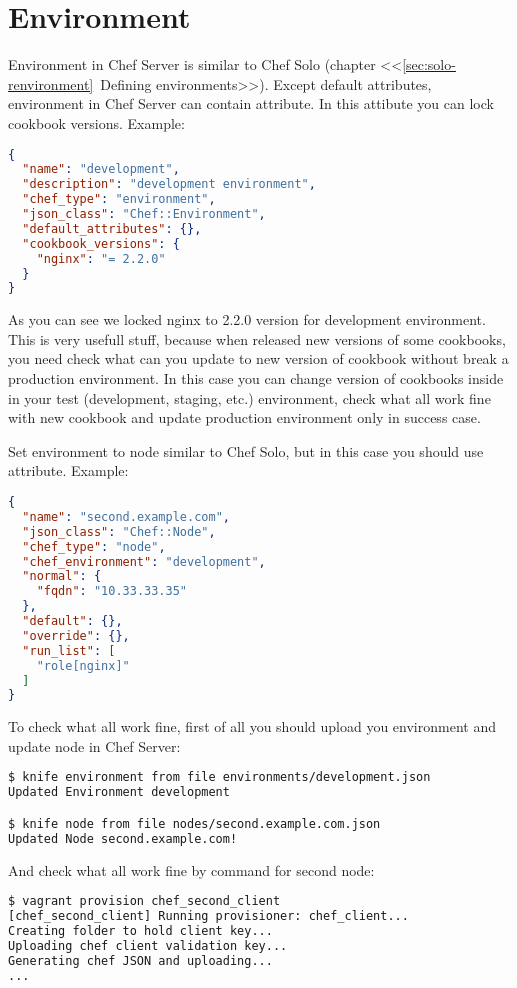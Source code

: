 \section{Environment}

Environment in Chef Server is similar to Chef Solo (chapter <<\ref{sec:solo-renvironment}~Defining environments>>). Except default attributes, environment in Chef Server can contain  attribute. In this attibute you can lock cookbook versions. Example:

\begin{lstlisting}[language=JSON,label=lst:my-serer-cloud-environment1,title=my-server-cloud/environments/development.json]
{
  "name": "development",
  "description": "development environment",
  "chef_type": "environment",
  "json_class": "Chef::Environment",
  "default_attributes": {},
  "cookbook_versions": {
    "nginx": "= 2.2.0"
  }
}
\end{lstlisting}

As you can see we locked nginx to 2.2.0 version for development environment. This is very usefull stuff, because when released new versions of some cookbooks, you need check what can you update to new version of cookbook without break a production environment. In this case you can change version of cookbooks inside  in your test (development, staging, etc.) environment, check what all work fine with new cookbook and update production environment only in success case.

Set environment to node similar to Chef Solo, but in this case you should use  attribute. Example:

\begin{lstlisting}[language=JSON,label=lst:my-serer-cloud-environment2,title=my-server-cloud/nodes/second.example.com.json]
{
  "name": "second.example.com",
  "json_class": "Chef::Node",
  "chef_type": "node",
  "chef_environment": "development",
  "normal": {
    "fqdn": "10.33.33.35"
  },
  "default": {},
  "override": {},
  "run_list": [
    "role[nginx]"
  ]
}
\end{lstlisting}

To check what all work fine, first of all you should upload you environment and update node in Chef Server:

\begin{lstlisting}[language=Bash,label=lst:my-serer-cloud-environment3]
$ knife environment from file environments/development.json
Updated Environment development

$ knife node from file nodes/second.example.com.json
Updated Node second.example.com!
\end{lstlisting}

And check what all work fine by command  for second node:

\begin{lstlisting}[language=Bash,label=lst:my-serer-cloud-environment4]
$ vagrant provision chef_second_client
[chef_second_client] Running provisioner: chef_client...
Creating folder to hold client key...
Uploading chef client validation key...
Generating chef JSON and uploading...
...
\end{lstlisting}
